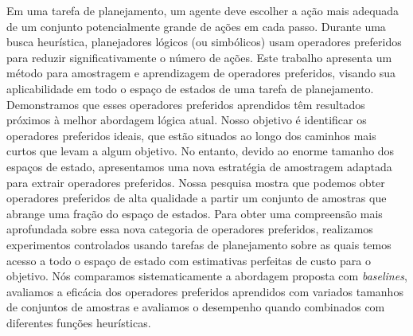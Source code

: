 \documentclass[ppgc,diss,english]{iiufrgs}
\begin{document}
\begin{translatedabstract}
Em uma tarefa de planejamento, um agente deve escolher a ação mais adequada de um conjunto potencialmente grande de ações em cada passo. Durante uma busca heurística, planejadores lógicos (ou simbólicos) usam operadores preferidos para reduzir significativamente o número de ações. Este trabalho apresenta um método para amostragem e aprendizagem de operadores preferidos, visando sua aplicabilidade em todo o espaço de estados de uma tarefa de planejamento. Demonstramos que esses operadores preferidos aprendidos têm resultados próximos à melhor abordagem lógica atual.
Nosso objetivo é identificar os operadores preferidos ideais, que estão situados ao longo dos caminhos mais curtos que levam a algum objetivo. No entanto, devido ao enorme tamanho dos espaços de estado, apresentamos uma nova estratégia de amostragem adaptada para extrair operadores preferidos. Nossa pesquisa mostra que podemos obter operadores preferidos de alta qualidade a partir um conjunto de amostras que abrange uma fração do espaço de estados.
Para obter uma compreensão mais aprofundada sobre essa nova categoria de operadores preferidos, realizamos experimentos controlados usando tarefas de planejamento sobre as quais temos acesso a todo o espaço de estado com estimativas perfeitas de custo para o objetivo. Nós comparamos sistematicamente a abordagem proposta com \textit{baselines}, avaliamos a eficácia dos operadores preferidos aprendidos com variados tamanhos de conjuntos de amostras e avaliamos o desempenho quando combinados com diferentes funções heurísticas.
\end{translatedabstract}
\end{document}
